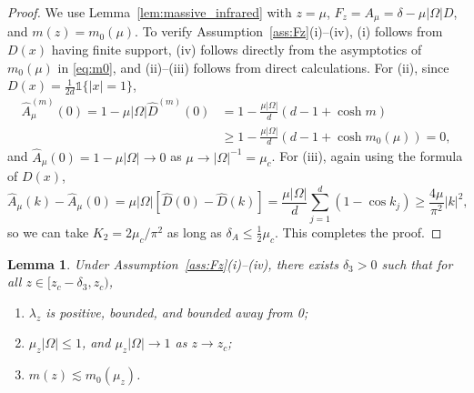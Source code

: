 \documentclass[11pt,hidelinks]{article}
\theoremstyle{plain}
\newtheorem{lemma}[theorem]{Lemma}
\numberwithin{equation}{section}
\newcommand{\inv}{^{-1}}
\renewcommand{\(}{\left(}
\renewcommand{\)}{\right)}
\newcommand{\half}{\frac{1}{2}}
\newcommand{\1}{\mathds{1}}
\newcommand{\nl}{\nonumber \\}
\providecommand{\abs}[1]{\lvert#1\rvert}
\newcommand{\mz}{m(z)}
\newcommand{\supm}{^{(m)}}
\begin{document}
\begin{proof}
We use Lemma~\ref{lem:massive_infrared} with $z = \mu$, $F_z = A_\mu = \delta - \mu\abs\Omega D$, and $\mz = m_0(\mu)$. 
To verify Assumption~\ref{ass:Fz}(i)--(iv), 
(i) follows from $D(x)$ having finite support,
(iv) follows directly from the asymptotics of $m_0(\mu)$ in \eqref{eq:m0},
and (ii)--(iii) follows from direct calculations.
For (ii), since $D(x) = \frac 1 {2d}  \1 \{\abs x = 1\}$, 
\begin{align}
\hat A_\mu\supm(0) = 1 - \mu\abs\Omega \hat D\supm(0)
&= 1 - \frac {\mu\abs\Omega} d ( d - 1 + \cosh m ) 		 \nl
&\ge 1 - \frac {\mu\abs\Omega} d ( d-1 + \cosh m_0(\mu) ) = 0, 
\end{align}
and $\hat A_\mu(0) = 1 - \mu \abs\Omega \to 0$ as $\mu \to \abs\Omega\inv =  \mu_c$. 
For (iii), again using the formula of $D(x)$, 
\begin{equation}
\hat A_\mu(k) - \hat A_\mu(0)
= \mu\abs\Omega [ \hat D(0) -  \hat D(k) ]
= \frac {\mu\abs\Omega} d \sum_{j=1}^d (1 - \cos k_j) \ge \frac {4\mu} {\pi^2}\abs k^2,
\end{equation}
so we can take $K_2 = 2\mu_c/ \pi^2$ as long as $\delta_A \le \half \mu_c$. 
This completes the proof.
\end{proof}






\begin{lemma}
\label{lem:mass}
Under Assumption~\ref{ass:Fz}(i)--(iv), 
there exists $\delta_3 >0$ such that for all $z \in [ z_c - \delta_3, z_c )$,
\begin{enumerate}[label=(\roman*)]
\item
$\lambda_z$ is positive, bounded, and bounded away from 0;

\item
$\mu_z\abs\Omega \le 1$, and $\mu_z\abs\Omega \to 1$ as $z\to z_c$;

\item
$ m(z) \lesssim m_0(\mu_z) $.
\end{enumerate}
\end{lemma}
\end{document}
